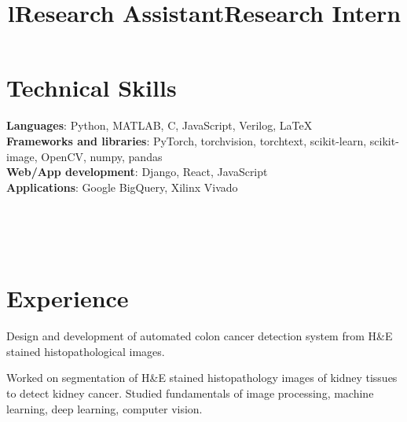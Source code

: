 \documentclass[margin]{res}
\begin{document}
\begin{resume}
    \section{Technical Skills}
      \textbf{Languages}: Python, MATLAB, C, JavaScript, Verilog, \LaTeX
      \\
      \textbf{Frameworks and libraries}: PyTorch, torchvision, torchtext, scikit-learn, scikit-image, OpenCV, numpy, pandas
      \\
      \textbf{Web/App development}: Django, React, JavaScript
      \\
      \textbf{Applications}: Google BigQuery, Xilinx Vivado


    \begin{format}
      \title{l}\\
      \\
      \body\\
    \end{format}

    \section{Experience}
      \title{\textbf{Research Assistant}}
      \begin{position}
        Design and development of automated colon cancer detection system from H\&E stained histopathological images.
      \end{position}

      \title{\textbf{Research Intern}}
      \begin{position}
        Worked on segmentation of H\&E stained histopathology images of kidney tissues to detect kidney cancer. Studied fundamentals of image processing, machine learning, deep learning, computer vision.
      \end{position}


\end{resume}
\end{document}
